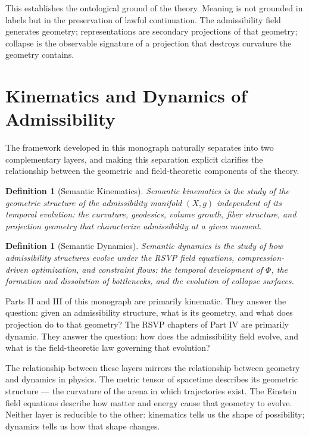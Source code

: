 \documentclass[12pt, oneside]{book}
\theoremstyle{plain-flyxion}
\theoremstyle{definition-flyxion}
\newtheorem{definition}[theorem]{Definition}
\begin{document}
This establishes the ontological ground of the theory. Meaning is not grounded in labels
but in the preservation of lawful continuation. The admissibility field generates
geometry; representations are secondary projections of that geometry; collapse is the
observable signature of a projection that destroys curvature the geometry contains.

\section{Kinematics and Dynamics of Admissibility}

The framework developed in this monograph naturally separates into two complementary
layers, and making this separation explicit clarifies the relationship between the
geometric and field-theoretic components of the theory.

\begin{definition}[Semantic Kinematics]
\emph{Semantic kinematics} is the study of the geometric structure of the admissibility
manifold $(X, g)$ independent of its temporal evolution: the curvature, geodesics, volume
growth, fiber structure, and projection geometry that characterize admissibility at a
given moment.
\end{definition}

\begin{definition}[Semantic Dynamics]
\emph{Semantic dynamics} is the study of how admissibility structures evolve under the
RSVP field equations, compression-driven optimization, and constraint flows: the temporal
development of $\Phi$, the formation and dissolution of bottlenecks, and the evolution
of collapse surfaces.
\end{definition}

Parts II and III of this monograph are primarily kinematic. They answer the question:
given an admissibility structure, what is its geometry, and what does projection do to
that geometry? The RSVP chapters of Part IV are primarily dynamic. They answer the
question: how does the admissibility field evolve, and what is the field-theoretic law
governing that evolution?

The relationship between these layers mirrors the relationship between geometry and
dynamics in physics. The metric tensor of spacetime describes its geometric structure
--- the curvature of the arena in which trajectories exist. The Einstein field equations
describe how matter and energy cause that geometry to evolve. Neither layer is
reducible to the other: kinematics tells us the shape of possibility; dynamics tells
us how that shape changes.
\end{document}
